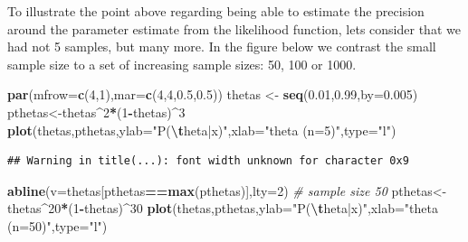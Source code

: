 \documentclass[
]{book}
\newenvironment{Shaded}{\begin{snugshade}}{\end{snugshade}}
\newcommand{\AttributeTok}[1]{\textcolor[rgb]{0.13,0.29,0.53}{#1}}
\newcommand{\CommentTok}[1]{\textcolor[rgb]{0.56,0.35,0.01}{\textit{#1}}}
\newcommand{\DecValTok}[1]{\textcolor[rgb]{0.00,0.00,0.81}{#1}}
\newcommand{\FloatTok}[1]{\textcolor[rgb]{0.00,0.00,0.81}{#1}}
\newcommand{\FunctionTok}[1]{\textcolor[rgb]{0.13,0.29,0.53}{\textbf{#1}}}
\newcommand{\NormalTok}[1]{#1}
\newcommand{\OtherTok}[1]{\textcolor[rgb]{0.56,0.35,0.01}{#1}}
\newcommand{\SpecialCharTok}[1]{\textcolor[rgb]{0.81,0.36,0.00}{\textbf{#1}}}
\newcommand{\StringTok}[1]{\textcolor[rgb]{0.31,0.60,0.02}{#1}}
\begin{document}
To illustrate the point above regarding being able to estimate the precision around the parameter estimate from the likelihood function, lets consider that we had not 5 samples, but many more. In the figure below we contrast the small sample size to a set of increasing sample sizes: 50, 100 or 1000.

\begin{Shaded}
\begin{Highlighting}[]
\FunctionTok{par}\NormalTok{(}\AttributeTok{mfrow=}\FunctionTok{c}\NormalTok{(}\DecValTok{4}\NormalTok{,}\DecValTok{1}\NormalTok{),}\AttributeTok{mar=}\FunctionTok{c}\NormalTok{(}\DecValTok{4}\NormalTok{,}\DecValTok{4}\NormalTok{,}\FloatTok{0.5}\NormalTok{,}\FloatTok{0.5}\NormalTok{))}
\NormalTok{thetas }\OtherTok{\textless{}{-}} \FunctionTok{seq}\NormalTok{(}\FloatTok{0.01}\NormalTok{,}\FloatTok{0.99}\NormalTok{,}\AttributeTok{by=}\FloatTok{0.005}\NormalTok{)}
\NormalTok{pthetas}\OtherTok{\textless{}{-}}\NormalTok{thetas}\SpecialCharTok{\^{}}\DecValTok{2}\SpecialCharTok{*}\NormalTok{(}\DecValTok{1}\SpecialCharTok{{-}}\NormalTok{thetas)}\SpecialCharTok{\^{}}\DecValTok{3}
\FunctionTok{plot}\NormalTok{(thetas,pthetas,}\AttributeTok{ylab=}\StringTok{"P(}\SpecialCharTok{\textbackslash{}t}\StringTok{heta|x)"}\NormalTok{,}\AttributeTok{xlab=}\StringTok{"theta (n=5)"}\NormalTok{,}\AttributeTok{type=}\StringTok{"l"}\NormalTok{)}
\end{Highlighting}
\end{Shaded}

\begin{verbatim}
## Warning in title(...): font width unknown for character 0x9
\end{verbatim}

\begin{Shaded}
\begin{Highlighting}[]
\FunctionTok{abline}\NormalTok{(}\AttributeTok{v=}\NormalTok{thetas[pthetas}\SpecialCharTok{==}\FunctionTok{max}\NormalTok{(pthetas)],}\AttributeTok{lty=}\DecValTok{2}\NormalTok{)}
\CommentTok{\# sample size 50}
\NormalTok{pthetas}\OtherTok{\textless{}{-}}\NormalTok{thetas}\SpecialCharTok{\^{}}\DecValTok{20}\SpecialCharTok{*}\NormalTok{(}\DecValTok{1}\SpecialCharTok{{-}}\NormalTok{thetas)}\SpecialCharTok{\^{}}\DecValTok{30}
\FunctionTok{plot}\NormalTok{(thetas,pthetas,}\AttributeTok{ylab=}\StringTok{"P(}\SpecialCharTok{\textbackslash{}t}\StringTok{heta|x)"}\NormalTok{,}\AttributeTok{xlab=}\StringTok{"theta  (n=50)"}\NormalTok{,}\AttributeTok{type=}\StringTok{"l"}\NormalTok{)}
\end{Highlighting}
\end{Shaded}
\end{document}
